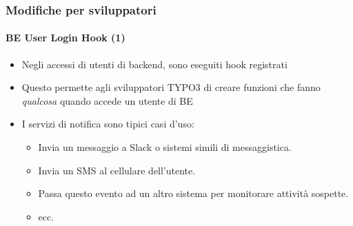 
\begin{frame}[fragile]
	\frametitle{Modifiche per sviluppatori}
	\framesubtitle{BE User Login Hook (1)}

	\lstset{basicstyle=\tiny\ttfamily}

	\begin{itemize}
		\item Negli accessi di utenti di backend, sono eseguiti hook registrati
		\item Questo permette agli sviluppatori TYPO3 di creare funzioni che fanno
			\textit{qualcosa} quando accede un utente di BE

		\item I servizi di notifica sono tipici casi d'uso:

			\begin{itemize}
				\item Invia un messaggio a Slack o sistemi simili di messaggistica.
				\item Invia un SMS al cellulare dell'utente.
				\item Passa questo evento ad un altro sistema per monitorare attività sospette.
				\item ecc.
			\end{itemize}

	\end{itemize}

\end{frame}


